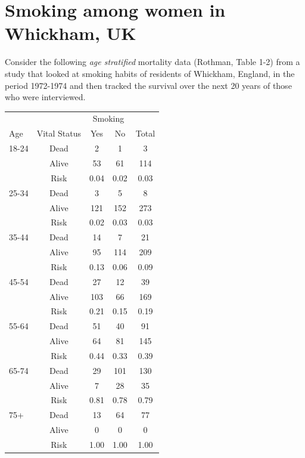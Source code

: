 \documentclass[landscape,twocolumn,letterpaper,9pt,reqno]{article}\usepackage[]{graphicx}\usepackage[]{color}
\begin{document}
\clearpage

\section{Smoking among women in Whickham, UK}
Consider the following \textit{age stratified} mortality data (Rothman, Table 1-2) from a study that looked at smoking habits of residents of Whickham, England, in the period 1972-1974 and then tracked the survival over the next 20 years of those who were interviewed. 


\begin{table}[h]
	\centering
	\begin{tabular}{lcccc}
		 &  &   \multicolumn{2}{c}{Smoking} &  \\		
		Age & Vital Status &  Yes & No & Total \\
		18-24 	& Dead 	& 2  	& 1 	& 3 	\\	
		 		& Alive & 53  	& 61 	& 114 	\\
		 		& Risk & 0.04  	& 0.02 	& 0.03 	\\
		 		\hline
		25-34 	& Dead 	& 3  	& 5 	& 8 	\\	
& Alive & 121  	& 152 	& 273 	\\
& Risk & 0.02  	& 0.03 	& 0.03 \\
\hline 			
35-44 	& Dead 	& 14  	& 7 	& 21 	\\	
& Alive & 95  	& 114 	& 209 	\\
& Risk & 0.13  	& 0.06 	& 0.09 \\
\hline
45-54 	& Dead 	& 27  	& 12 	& 39 	\\	
& Alive & 103  	& 66 	& 169 	\\
& Risk & 0.21  	& 0.15 	& 0.19 \\
		 		\hline
55-64 	& Dead 	& 51  	& 40 	& 91 	\\	
& Alive & 64  	& 81 	& 145 	\\
& Risk & 0.44  	& 0.33 	& 0.39 \\
		 		\hline
65-74 	& Dead 	& 29  	& 101 	& 130 	\\	
& Alive & 7  	& 28 	& 35 	\\
& Risk & 0.81  	& 0.78 	& 0.79 \\
		 		\hline
75+ 	& Dead 	& 13  	& 64 	& 77 	\\	
& Alive & 0  	& 0 	& 0 	\\
& Risk & 1.00  	& 1.00 	& 1.00 \\
\hline
	\end{tabular}
\end{table}
\end{document}

